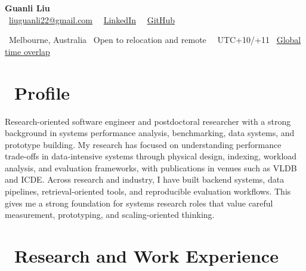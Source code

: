 \documentclass{resume}
\begin{document}

{\LARGE \textbf{Guanli Liu}}\\[-0.2em]
\faEnvelope\ \href{mailto:liuguanli22@gmail.com}{liuguanli22@gmail.com} 
\textperiodcentered\ 
\faLinkedin\ \href{https://www.linkedin.com/in/guanli-liu-11353058/}{LinkedIn} \textperiodcentered\ 
\faGithub\ \href{https://github.com/Liuguanli}{GitHub}

\faMapMarker\ Melbourne, Australia \textperiodcentered\ Open to relocation and remote \textperiodcentered\ 
\faClockO\  UTC+10/+11 \textperiodcentered\ 
\href{https://www.worldtimebuddy.com/?lid=5808079,5128581,5809844,1816670,2158177&h=2158177&hf=1}{Global time overlap \faExternalLink}
\vspace{0.4em}



\section{\faUser\ \textbf{Profile}}
Research-oriented software engineer and postdoctoral researcher with a strong background in systems performance analysis, benchmarking, data systems, and prototype building. My research has focused on understanding performance trade-offs in data-intensive systems through physical design, indexing, workload analysis, and evaluation frameworks, with publications in venues such as VLDB and ICDE. Across research and industry, I have built backend systems, data pipelines, retrieval-oriented tools, and reproducible evaluation workflows. This gives me a strong foundation for systems research roles that value careful measurement, prototyping, and scaling-oriented thinking.



\section{\faUsers\ \textbf{Research and Work Experience}}

\end{document}
